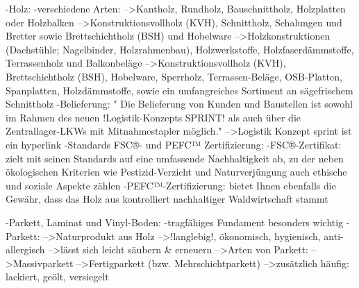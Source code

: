                 -Holz: -verschiedene Arten:%
                            -->Kantholz, Rundholz, Bauschnittholz, Holzplatten oder           Holzbalken
                            -->Konstruktionsvollholz (KVH), Schnittholz, Schalungen und       Bretter sowie Brettschichtholz (BSH) und Hobelware
                            -->Holzkonstruktionen (Dachstühle; Nagelbinder,                   Holzrahmenbau), Holzwerkstoffe, Holzfaserdämmstoffe,          Terrassenholz und Balkonbeläge
                            -->Konstruktionsvollholz (KVH), Brettschichtholz (BSH),           Hobelware, Sperrholz, Terrassen-Beläge, OSB-Platten,          Spanplatten,  Holzdämmstoffe, sowie ein umfangreiches         Sortiment an sägefrischem Schnittholz
                        -Belieferung: 
                            " Die Belieferung von Kunden und Baustellen ist sowohl im Rahmen des neuen !Logistik-Konzepts SPRINT! als auch über die  Zentrallager-LKWs mit Mitnahmestapler möglich."
                                -->Logistik Konzept sprint ist ein hyperlink
                        -Standards FSC®- und PEFC™ Zertifizierung:
                            -FSC®-Zertifikat:
                                zielt mit seinen Standards auf eine umfassende Nachhaltigkeit ab, zu der neben ökologischen Kriterien wie Pestizid-Verzicht und Naturverjüngung auch ethische und soziale Aspekte zählen
                            -PEFC™-Zertifizierung:
                                bietet Ihnen ebenfalls die Gewähr, dass das Holz aus kontrolliert nachhaltiger Waldwirtschaft stammt
                                
                -Parkett, Laminat und Vinyl-Boden:
                    -tragfähiges Fundament besonders wichtig
                    -Parkett:
                        -->Naturprodukt aus Holz
                        -->!langlebig!, ökonomisch, hygienisch, anti-allergisch
                        -->lässt sich leicht säubern & erneuern
                        -->Arten von Parkett: 
                            -->Massivparkett  
                            -->Fertigparkett (bzw. Mehrschichtparkett)
                        -->zusätzlich häufig: lackiert, geölt, versiegelt
                        
